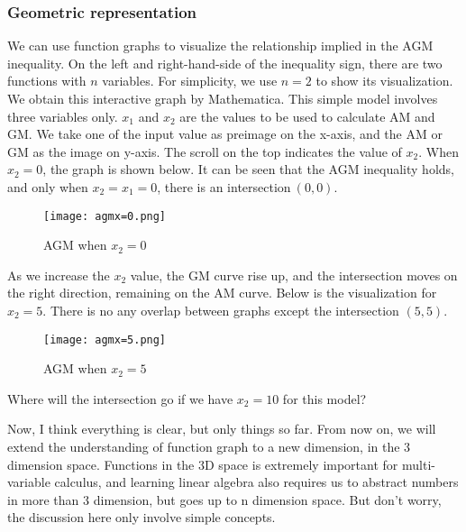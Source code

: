\subsubsection*{Geometric representation}
We can use function graphs to visualize the relationship implied in the AGM inequality. On the left and right-hand-side of the inequality sign, there are two functions with $n$ variables.
For simplicity, we use $n=2$ to show its visualization.
We obtain this interactive graph by Mathematica. This simple model involves three variables only. $\displaystyle x_{1}$ and $\displaystyle x_{2}$ are the values to be used to calculate AM and GM. 
We take one of the input value as preimage on the x-axis, and the AM or GM as the image on y-axis. The scroll on the top indicates the value of $\displaystyle x_{2}$. When $\displaystyle x_{2} =0$, the 
graph is shown below. It can be seen that the AGM inequality holds, and only when $\displaystyle x_{2} =x_{1} =0$, there is an intersection$\displaystyle \ ( 0,0) .$

\begin{figure}[H]
    \centering
    \texttt{[image: agmx=0.png]}
    \caption{AGM when $x_2 = 0$}
\end{figure}

As we increase the $\displaystyle x_{2}$ value, the GM curve rise up, and the intersection moves on the right direction, remaining on the AM curve. Below is the visualization for $\displaystyle x_{2} =5$. 
There is no any overlap between graphs except the intersection $\displaystyle ( 5,5)$. 

\begin{figure}[H]
    \centering
    \texttt{[image: agmx=5.png]}
    \caption{AGM when $x_2 = 5$}
\end{figure}

\begin{problem}
    Where will the intersection go if we have $x_2 = 10$ for this model?
\end{problem}

Now, I think everything is clear, but only things so far. From now on, we will extend the understanding of function graph to a new
dimension, in the 3 dimension space. Functions in the 3D space is extremely important for multi-variable calculus, and learning linear 
algebra also requires us to abstract numbers in more than 3 dimension, but goes up to n dimension space. But don't worry, the discussion
here only involve simple concepts. 

